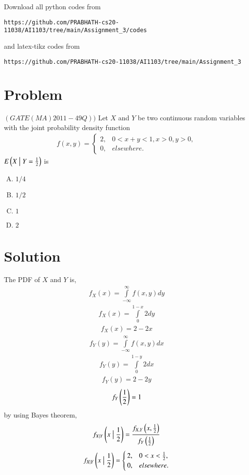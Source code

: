 \documentclass[journal,12pt,twocolumn]{IEEEtran}
\begin{document}
Download all python codes from 
\begin{lstlisting}
https://github.com/PRABHATH-cs20-11038/AI1103/tree/main/Assignment_3/codes
\end{lstlisting}

and latex-tikz codes from
\begin{lstlisting}
https://github.com/PRABHATH-cs20-11038/AI1103/tree/main/Assignment_3
\end{lstlisting}

\section{Problem}

$(GATE(MA) 2011-49Q))$ Let $X$ and $Y$ be two continuous random variables with the joint probability density function
\begin{align}
    f(x,y) =
    \begin{cases}
    2, & 0<x+y<1, x>0, y>0,\\
    0, & elsewhere.
    \end{cases}
\end{align}
$E\left(X \bigm| Y=\frac{1}{2}\right)$ is
\begin{enumerate}[(A)]
    \item $1/4$
    \item $1/2$
    \item $1$
    \item $2$
\end{enumerate}
\section{Solution}

The PDF of $X$ and $Y$ is,
\begin{align}
    f_X(x)=\int\limits_{-\infty}^\infty f(x,y)d y
\end{align}
\begin{align}
    f_X(x)=\int\limits_0^{1-x}2d y
\end{align}
\begin{align}
    f_X(x)=2-2x
\end{align}
\begin{align}
    f_Y(y)=\int\limits_{-\infty}^\infty f(x,y)d x
\end{align}
\begin{align}
    f_Y(y)=\int\limits_0^{1-y}2d x
\end{align}
\begin{align}
    f_Y(y)=2-2y
\end{align}
\begin{align}
    f_Y\left(\frac{1}{2}\right)=1
\end{align}
by using Bayes theorem,
\begin{align}
    f_{X \mid Y}\left(x \bigm| \frac{1}{2}\right)=\frac{f_{X,Y}\left(x,\frac{1}{2}\right)}{f_Y\left(\frac{1}{2}\right)}
\end{align}
\begin{align}
    f_{X\mid Y}\left(x \bigm| \frac{1}{2}\right)=
    \begin{cases}
    2, & 0<x<\frac{1}{2},\\
    0, & elsewhere.
    \end{cases}
\end{align}
\end{document}
